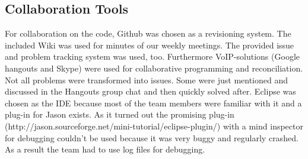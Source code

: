 \subsection{Collaboration Tools}
For collaboration on the code, Github was chosen as a revisioning system. The included Wiki was used for minutes of our weekly meetings. The provided issue and problem tracking system was used, too. Furthermore VoIP-solutions (Google hangouts and Skype) were used for collaborative programming and reconciliation. Not all problems were transformed into issues. Some were just mentioned and discussed in the Hangouts group chat and then quickly solved after. Eclipse was chosen as the IDE because most of the team members were familiar with it and a plug-in for Jason exists. As it turned out the promising plug-in (http://jason.sourceforge.net/mini-tutorial/eclipse-plugin/) with a mind inspector for debugging couldn't be used because it was very buggy and regularly crashed. As a result the team had to use log files for debugging. 

